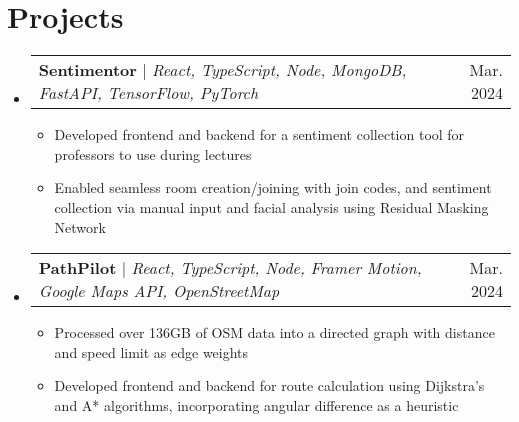 \documentclass[letterpaper,12pt]{article}
\makeatletter
\newcommand{\resumeItem}[1]{
  \item\small{
    {#1 \vspace{-2pt}}
  }
}
\newcommand{\resumeProjectHeading}[2]{
    \item
    \begin{tabular*}{0.97\textwidth}{l@{\extracolsep{\fill}}r}
      \small#1 & #2 \\
    \end{tabular*}\vspace{-7pt}
}
\newcommand{\resumeSubHeadingListStart}{\begin{itemize}[leftmargin=0.15in, label={}]}
\newcommand{\resumeSubHeadingListEnd}{\end{itemize}}
\newcommand{\resumeItemListStart}{\begin{itemize}}
\newcommand{\resumeItemListEnd}{\end{itemize}\vspace{-5pt}}
\makeatother
\begin{document}
\section{Projects}
    \resumeSubHeadingListStart
      \resumeProjectHeading
          {\textbf{Sentimentor} $|$ \emph{React, TypeScript, Node, MongoDB, FastAPI, TensorFlow, PyTorch}}{Mar. 2024}
          \resumeItemListStart
            \resumeItem{Developed frontend and backend for a sentiment collection tool for professors to use during lectures}
            \resumeItem{Enabled seamless room creation/joining with join codes, and sentiment collection via manual input and facial analysis using Residual Masking Network}
          \resumeItemListEnd
      \resumeProjectHeading
          {\textbf{PathPilot} $|$ \emph{React, TypeScript, Node, Framer Motion, Google Maps API, OpenStreetMap}}{Mar. 2024}
          \resumeItemListStart
            \resumeItem{Processed over 136GB of OSM data into a directed graph with distance and speed limit as edge weights}
            \resumeItem{Developed frontend and backend for route calculation using Dijkstra’s and A* algorithms, incorporating angular difference as a heuristic}
          \resumeItemListEnd
    \resumeSubHeadingListEnd
\end{document}
